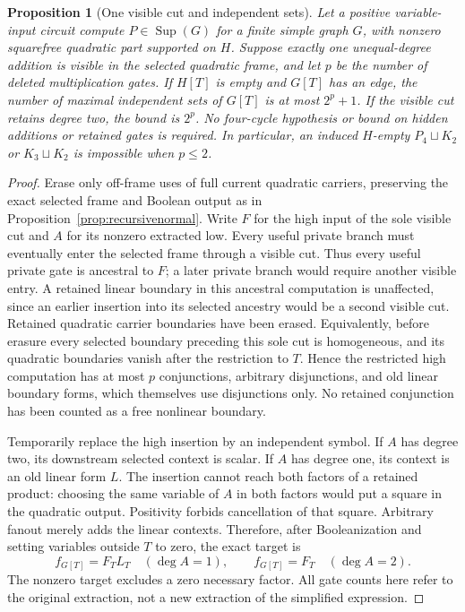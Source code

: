 \documentclass[11pt]{article}
\newcommand{\Sup}{\operatorname{Sup}}
\newtheorem{proposition}[theorem]{Proposition}
\theoremstyle{definition}
\theoremstyle{remark}
\begin{document}
\begin{proposition}[One visible cut and independent sets]\label{prop:onevisibleclauses}
Let a positive variable-input circuit compute $P\in\Sup(G)$ for a finite simple graph $G$, with nonzero squarefree quadratic part supported on $H$. Suppose exactly one unequal-degree addition is visible in the selected quadratic frame, and let $p$ be the number of deleted multiplication gates. If $H[T]$ is empty and $G[T]$ has an edge, the number of maximal independent sets of $G[T]$ is at most $2^p+1$. If the visible cut retains degree two, the bound is $2^p$. No four-cycle hypothesis or bound on hidden additions or retained gates is required. In particular, an induced $H$-empty $P_4\sqcup K_2$ or $K_3\sqcup K_2$ is impossible when $p\le2$.
\end{proposition}
\begin{proof}
Erase only off-frame uses of full current quadratic carriers, preserving the exact selected frame and Boolean output as in Proposition~\ref{prop:recursivenormal}. Write $F$ for the high input of the sole visible cut and $A$ for its nonzero extracted low. Every useful private branch must eventually enter the selected frame through a visible cut. Thus every useful private gate is ancestral to $F$; a later private branch would require another visible entry. A retained linear boundary in this ancestral computation is unaffected, since an earlier insertion into its selected ancestry would be a second visible cut. Retained quadratic carrier boundaries have been erased. Equivalently, before erasure every selected boundary preceding this sole cut is homogeneous, and its quadratic boundaries vanish after the restriction to $T$. Hence the restricted high computation has at most $p$ conjunctions, arbitrary disjunctions, and old linear boundary forms, which themselves use disjunctions only. No retained conjunction has been counted as a free nonlinear boundary.

Temporarily replace the high insertion by an independent symbol. If $A$ has degree two, its downstream selected context is scalar. If $A$ has degree one, its context is an old linear form $L$. The insertion cannot reach both factors of a retained product: choosing the same variable of $A$ in both factors would put a square in the quadratic output. Positivity forbids cancellation of that square. Arbitrary fanout merely adds the linear contexts. Therefore, after Booleanization and setting variables outside $T$ to zero, the exact target is
\[
 f_{G[T]}=F_T L_T\quad(\deg A=1),\qquad
 f_{G[T]}=F_T\quad(\deg A=2).
\]
The nonzero target excludes a zero necessary factor. All gate counts here refer to the original extraction, not a new extraction of the simplified expression.


\end{proof}
\end{document}
